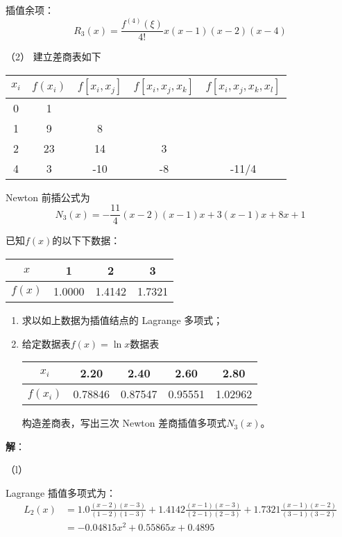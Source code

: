 \documentclass[UTF8,a4paper,11pt,oneside]{ctexbook}
\begin{document}
插值余项：
\[
R_3(x)=\frac{f^{(4)}(\xi)}{4!}x(x-1)(x-2)(x-4)
\]

（2）
建立差商表如下
\begin{center}
    \begin{tabular}{|c|c|c|c|c|}
        \hline
        \(x_i\) & \(f(x_i)\) & \(f[x_i,x_j]\) & \(f[x_i,x_j,x_k]\) & \(f[x_i,x_j,x_k,x_l]\) \\
        \hline
        0 & 1 & & & \\
        \hline
        1 & 9 & 8 & & \\
        \hline
        2 & 23 & 14 & 3 & \\
        \hline
        4 & 3 & -10 & -8 & -11/4\\
        \hline
    \end{tabular}
\end{center}

Newton 前插公式为
\[
N_3(x)=-\frac{11}{4}(x-2)(x-1)x+3(x-1)x+8x+1
\]

\vspace{4em}
已知\(f(x)\)的以下下数据：

\begin{center}
    \begin{tabular}{|c|c|c|c|}
        \hline
        \(x\) & 1 & 2 & 3 \\
        \hline
        \(f(x)\) & 1.0000 & 1.4142 & 1.7321 \\
        \hline
    \end{tabular}
\end{center}
\begin{enumerate}
    \item 求以如上数据为插值结点的 Lagrange 多项式；
    \item 给定数据表\(f(x)=\ln x\)数据表\begin{center}
        \begin{tabular}{|c|c|c|c|c|}
            \hline
            \(x_i\) & 2.20 & 2.40 & 2.60 & 2.80 \\
            \hline
            \(f(x_i)\) & 0.78846 & 0.87547 & 0.95551 & 1.02962 \\
            \hline
        \end{tabular}
    \end{center}构造差商表，写出三次 Newton 差商插值多项式\(N_3(x)\)。
\end{enumerate}
\textbf{解}：

（l）

Lagrange 插值多项式为：
\begin{align*}
    L_2(x) & =1.0\tfrac{(x-2)(x-3)}{(1-2)(1-3)}+1.4142\tfrac{(x-1)(x-3)}{(2-1)(2-3)}+1.7321\tfrac{(x-1)(x-2)}{(3-1)(3-2)}\\
    & =-0.04815x^2+0.55865x+0.4895
\end{align*}
\end{document}
